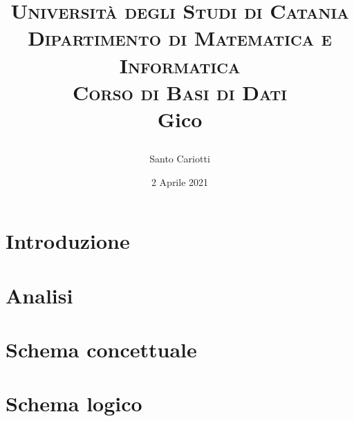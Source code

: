 

\title{
    \small\textsc{Università degli Studi di Catania\\Dipartimento di Matematica e Informatica\\Corso di Basi di Dati}\\
    \Huge\textbf{Gico}\\
    \author{Santo Cariotti}
    \date{2 Aprile 2021}
}

\usepackage{graphicx}

\maketitle

\renewcommand{\contentsname}{Indice}
\tableofcontents{}


\chapter{Introduzione}


\chapter{Analisi}


\chapter{Schema concettuale}


\chapter{Schema logico}



